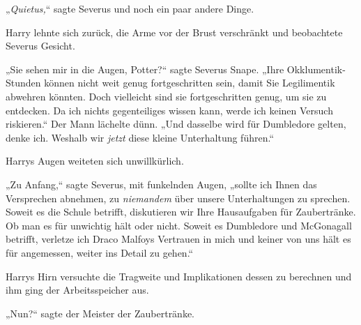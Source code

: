 „\emph{Quietus,}“ sagte Severus und noch ein paar andere Dinge.

Harry lehnte sich zurück, die Arme vor der Brust verschränkt und beobachtete Severus Gesicht.

„Sie sehen mir in die Augen, Potter?“ sagte Severus Snape. „Ihre Okklumentik-Stunden können nicht weit genug fortgeschritten sein, damit Sie Legilimentik abwehren könnten. Doch vielleicht sind sie fortgeschritten genug, um sie zu entdecken. Da ich nichts gegenteiliges wissen kann, werde ich keinen Versuch riskieren.“ Der Mann lächelte dünn. „Und dasselbe wird für Dumbledore gelten, denke ich. Weshalb wir \emph{jetzt} diese kleine Unterhaltung führen.“

Harrys Augen weiteten sich unwillkürlich.

„Zu Anfang,“ sagte Severus, mit funkelnden Augen, „sollte ich Ihnen das Versprechen abnehmen, zu \emph{niemandem} über unsere Unterhaltungen zu sprechen. Soweit es die Schule betrifft, diskutieren wir Ihre Hausaufgaben für Zaubertränke. Ob man es für unwichtig hält oder nicht. Soweit es Dumbledore und McGonagall betrifft, verletze ich Draco Malfoys Vertrauen in mich und keiner von uns hält es für angemessen, weiter ins Detail zu gehen.“

Harrys Hirn versuchte die Tragweite und Implikationen dessen zu berechnen und ihm ging der Arbeitsspeicher aus.

„Nun?“ sagte der Meister der Zaubertränke.

